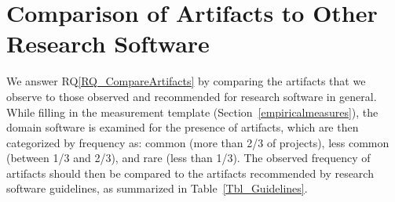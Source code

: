 \documentclass[runningheads]{llncs}
\newcommand{\rqref}[1]{RQ\ref{#1}}
\begin{document}
\section{Comparison of Artifacts to Other Research Software}
\label{Sec_CompareArtifacts}

We answer \rqref{RQ_CompareArtifacts} by comparing the artifacts that we observe
to those observed and recommended for research software in general.  While
filling in the measurement template (Section~\ref{empiricalmeasures}), the
domain software is examined for the presence of artifacts, which are then
categorized by frequency as: common (more than 2/3 of projects), less common
(between 1/3 and 2/3), and rare (less than 1/3). The observed frequency of
artifacts should then be compared to the artifacts recommended by research
software guidelines, as summarized in Table~\ref{Tbl_Guidelines}.  
\end{document}
